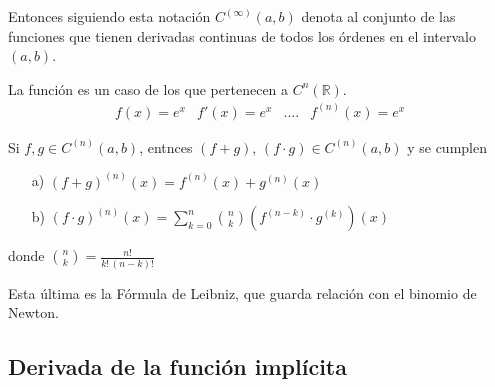 \documentclass[10pt,twoside]{SelfArx} %
\begin{document}
Entonces siguiendo esta notaci\'on $ C^{(\infty)}(a,b) $ denota al conjunto de las funciones que tienen derivadas continuas de todos los \'ordenes en el intervalo $ (a,b) $.\\
\begin{ejemplo}
	La funci\'on es un caso de los que pertenecen a $ C^{n}(\mathbb{R}) $.
	\begin{equation}
	\begin{array}{llll}
	f(x)=e^{x} & f'(x)=e^{x} & .... & f^{(n)}(x)=e^{x}
	\end{array}
	\end{equation}
\end{ejemplo}


\begin{propiedad}
	Si $ f,g\in C^{(n)}(a,b) $, entnces $ (f+g) $, $ (f\cdot g)\in C^{(n)}(a,b) $ y se cumplen
	\begin{enumerate}
		\item [a)]	$ \displaystyle (f+g)^{(n)}(x)=f^{(n)}(x)+g^{(n)}(x) $
		\item [b)]	$\displaystyle  (f\cdot g)^{(n)}(x)=\sum_{k=0}^{n}{n \choose k } \left (f^{(n-k)}\cdot g^{(k)}\right )(x) $
	\end{enumerate}
	donde $ {n \choose k }=
	\frac{n!}{k!\, (n-k)!} $
\end{propiedad}
Esta última  es la Fórmula de Leibniz, que guarda relación con el binomio de Newton.\\



\subsection{Derivada de la función implícita}
\end{document}
